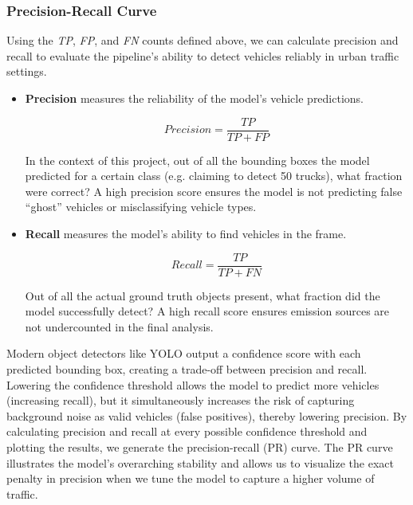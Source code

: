 \subsubsection{Precision-Recall Curve}
Using the \textit{TP}, \textit{FP}, and \textit{FN} counts defined above, we can calculate 
precision and recall to evaluate the pipeline's ability to detect vehicles reliably in  
urban traffic settings.

\begin{itemize}
    \item \textbf{Precision} measures the reliability of the model’s vehicle predictions.

    \begin{equation}
    Precision = \frac{TP}{TP + FP}
    \end{equation}

    In the context of this project, out of all the bounding boxes the model predicted 
    for a certain class (e.g. claiming to detect 50 trucks), what fraction were correct? 
    A high precision score ensures the model is not predicting false ``ghost'' 
    vehicles or misclassifying vehicle types.

    \item \textbf{Recall} measures the model's ability to find vehicles in the frame.

    \begin{equation}
    Recall = \frac{TP}{TP + FN}
    \end{equation}

    Out of all the actual ground truth objects present, what 
    fraction did the model successfully detect? A high recall score ensures 
    emission sources are not undercounted in the final analysis.
\end{itemize}

Modern object detectors like YOLO output a confidence score with each 
predicted bounding box, creating a trade-off between precision and 
recall. Lowering the confidence threshold allows the model to predict more 
vehicles (increasing recall), but it simultaneously increases the risk of 
capturing background noise as valid vehicles (false positives), thereby 
lowering precision. By calculating precision and recall at every possible 
confidence threshold and plotting the results, we generate the precision-recall 
(PR) curve. The PR curve illustrates the model's overarching stability and allows us to 
visualize the exact penalty in precision when we tune the model to capture a 
higher volume of traffic.

